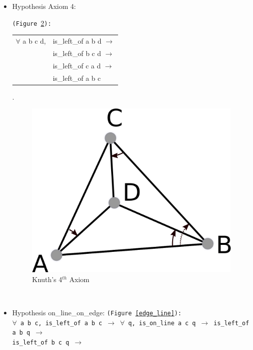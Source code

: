\documentclass[a4paper,10pt]{article}
\def\hypothesis#1#2{{\color{purple}Hypothesis} {\color{blue}#1}: {\tt #2}}
\begin{document}
\begin{itemize}
\begin{figure}
\caption{\label{knuth5} Knuth's 5$^{th}$ Axiom}
\end{figure}\\
The idea to understand this hypothesis is that we're sorting {\tt c d} and {\tt q} in a semi-plane defined by {\tt a} and {\tt b}.
\item \hypothesis{Axiom 4}{(Figure \ref{knuth4}):\\ \begin{tabular}{ll}
             $\forall$ a b c d,                  &is\_left\_of a b d $\rightarrow$\\
                                           &is\_left\_of b c d $\rightarrow$\\
                                           &is\_left\_of c a d $\rightarrow$\\
                                           &is\_left\_of a b c
           \end{tabular}}.
\begin{figure}
\centering
\includegraphics[scale=2]{Axiom4}
\caption{\label{knuth4} Knuth's 4$^{th}$ Axiom}
\end{figure}\\
\item \hypothesis{on\_line\_on\_edge}{(Figure \ref{edge_line}):\\
  $\forall$ a b c, is\_left\_of a b c $\rightarrow$ $\forall$ q, is\_on\_line a c q $\rightarrow$ 
                                   is\_left\_of a b q $\rightarrow$\\ is\_left\_of b c q $\rightarrow$
}
\end{itemize}
\end{document}
